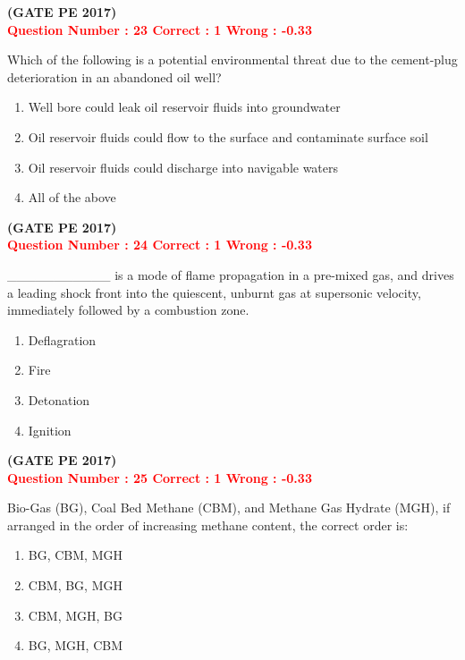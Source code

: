 \documentclass[12pt]{article}
\begin{document}
{\hfill\textbf{(GATE PE 2017)}\\[0.6cm]



\textcolor{red}{\textbf{Question Number : 23 \hfill Correct : 1  Wrong : -0.33}}

Which of the following is a potential environmental threat due to the cement-plug deterioration in an abandoned oil well?

\begin{enumerate}[label=(\Alph*)]
    \item Well bore could leak oil reservoir fluids into groundwater
    \item Oil reservoir fluids could flow to the surface and contaminate surface soil
    \item Oil reservoir fluids could discharge into navigable waters
    \item All of the above
\end{enumerate}
\hfill\textbf{(GATE PE 2017)}\\[0.6cm]

\textcolor{red}{\textbf{Question Number : 24 \hfill Correct : 1  Wrong : -0.33}}

\_\_\_\_\_\_\_\_\_\_\_ is a mode of flame propagation in a pre-mixed gas, and drives a leading shock front into the quiescent, unburnt gas at supersonic velocity, immediately followed by a combustion zone.

\begin{enumerate}[label=(\Alph*)]
    \item Deflagration
    \item Fire
    \item Detonation
    \item Ignition
\end{enumerate}

\hfill\textbf{(GATE PE 2017)}\\[0.6cm]

\textcolor{red}{\textbf{Question Number : 25 \hfill Correct : 1  Wrong : -0.33}}

Bio-Gas (BG), Coal Bed Methane (CBM), and Methane Gas Hydrate (MGH), if arranged in the order of increasing methane content, the correct order is:

\begin{enumerate}[label=(\Alph*)]
    \item BG, CBM, MGH
    \item CBM, BG, MGH
    \item CBM, MGH, BG
    \item BG, MGH, CBM
\end{enumerate}

}
\end{document}
